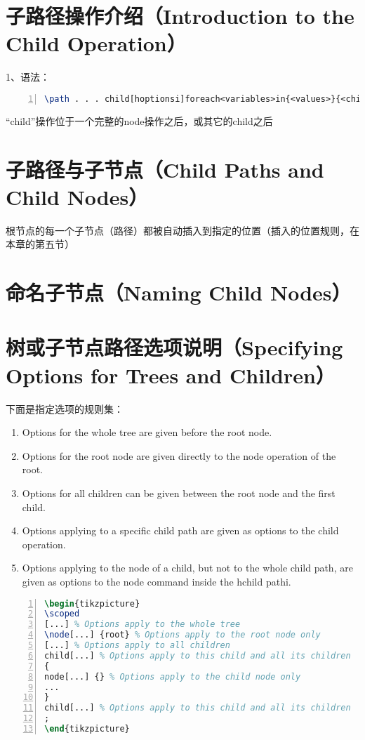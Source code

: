 
\section{子路径操作介绍（Introduction to the Child Operation）}
	1、语法：
	\begin{lstlisting}[basicstyle=\footnotesize\ttfamily,numbers=left,numberstyle=\tiny, numbersep=9pt, frame=single, language=tex]
\path . . . child[hoptionsi]foreach<variables>in{<values>}{<child path>} . . . ;
	\end{lstlisting}

	“child”操作位于一个完整的node操作之后，或其它的child之后

\section{子路径与子节点（Child Paths and Child Nodes）}
	根节点的每一个子节点（路径）都被自动插入到指定的位置（插入的位置规则，在本章的第五节）

\section{命名子节点（Naming Child Nodes）}


\section{树或子节点路径选项说明（Specifying Options for Trees and Children）}
	
	下面是指定选项的规则集：
	\begin{enumerate}
		\item Options for the whole tree are given before the root node.
		\item Options for the root node are given directly to the node operation of the root.
		\item Options for all children can be given between the root node and the first child.
		\item Options applying to a specific child path are given as options to the child operation.
		\item Options applying to the node of a child, but not to the whole child path, are given as options to the
node command inside the hchild pathi.
	\end{enumerate}
	
	\begin{lstlisting}[basicstyle=\footnotesize\ttfamily,numbers=left,numberstyle=\tiny, numbersep=9pt, frame=single, language=tex]
\begin{tikzpicture}
\scoped
[...] % Options apply to the whole tree
\node[...] {root} % Options apply to the root node only
[...] % Options apply to all children
child[...] % Options apply to this child and all its children
{
node[...] {} % Options apply to the child node only
...
}
child[...] % Options apply to this child and all its children
;
\end{tikzpicture}
	\end{lstlisting}

